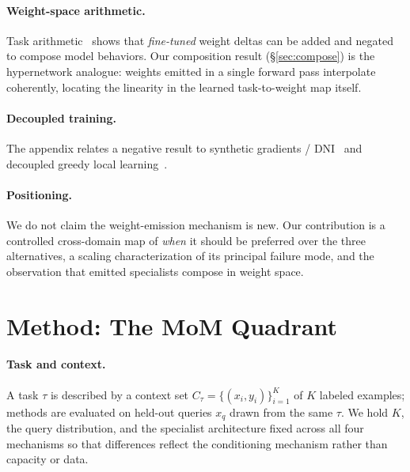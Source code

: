 \documentclass[11pt]{article}
\begin{document}
\paragraph{Weight-space arithmetic.} Task arithmetic~\citep{ilharco2023task} shows
that \emph{fine-tuned} weight deltas can be added and negated to compose model
behaviors. Our composition result (\S\ref{sec:compose}) is the hypernetwork
analogue: weights emitted in a single forward pass interpolate coherently, locating
the linearity in the learned task-to-weight map itself.

\paragraph{Decoupled training.} The appendix relates a negative result to synthetic
gradients / DNI~\citep{jaderberg2017dni} and decoupled greedy local
learning~\citep{nokland2019local,belilovsky2019greedy}.

\paragraph{Positioning.} We do not claim the weight-emission mechanism is new. Our
contribution is a controlled cross-domain map of \emph{when} it should be preferred
over the three alternatives, a scaling characterization of its principal failure
mode, and the observation that emitted specialists compose in weight space.

\section{Method: The MoM Quadrant}\label{sec:method}

\paragraph{Task and context.} A task $\tau$ is described by a context set
$C_\tau=\{(x_i,y_i)\}_{i=1}^K$ of $K$ labeled examples; methods are evaluated on
held-out queries $x_q$ drawn from the same $\tau$. We hold $K$, the query
distribution, and the specialist architecture fixed across all four mechanisms so
that differences reflect the conditioning mechanism rather than capacity or data.
\end{document}
